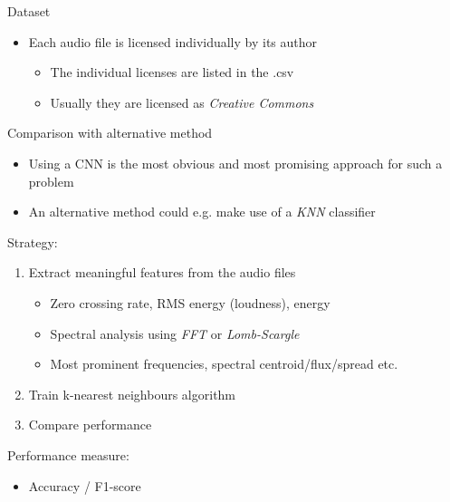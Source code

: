 \begin{frame}{Dataset}
{\begin{itemize}
      \begin{itemize}
        \item A website for sharing and classifying wildlife sound recordings
      \end{itemize}
      \item Each audio file is licensed individually by its author
      \begin{itemize}
        \item The individual licenses are listed in the .csv 
        \item Usually they are licensed as \textit{Creative Commons}
      \end{itemize}
    \end{itemize}
  }
\end{frame}

\begin{frame}{Comparison with alternative method}
  \begin{itemize}
    \item Using a CNN is the most obvious and most promising approach for such a problem 
    \item An alternative method could e.g. make use of a \textit{KNN} classifier
  \end{itemize}
  \vspace{2mm}
  \textcolor{tugreen}{\large Strategy:}
  \begin{enumerate}
    \item Extract meaningful features from the audio files 
    \begin{itemize}
      \item Zero crossing rate, RMS energy (loudness), energy
      \item Spectral analysis using \textit{FFT} or \textit{Lomb-Scargle}
      \item Most prominent frequencies, spectral centroid/flux/spread etc.
    \end{itemize}
    \item Train k-nearest neighbours algorithm 
    \item Compare performance
  \end{enumerate}
  \vspace{2mm}
  \textcolor{tugreen}{\large Performance measure:}
  \begin{itemize}
    \item Accuracy / F1-score
  \end{itemize}
\end{frame}
